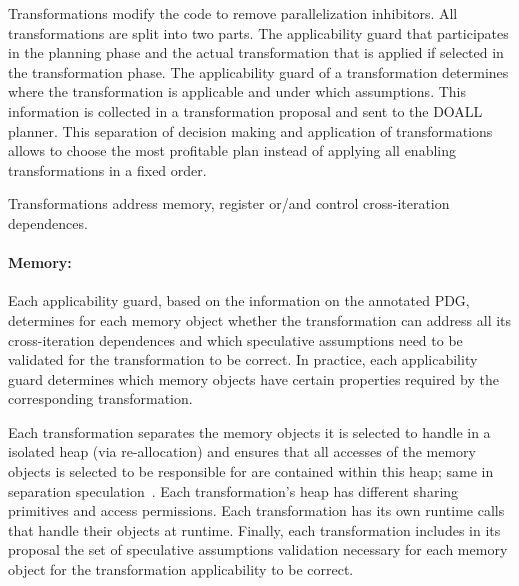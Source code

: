 Transformations modify the code to remove parallelization inhibitors.
%
All transformations are split into two parts. The applicability guard
that participates in the planning phase and the actual transformation
that is applied if selected in the transformation phase.
%
The applicability guard of a transformation determines where the
transformation is applicable and under which assumptions.
%
This information is collected in a transformation proposal and sent to
the DOALL planner.
%
This separation of decision making and application of transformations
allows \name to choose the most profitable plan instead of applying
all enabling transformations in a fixed order.
%

Transformations address memory, register or/and control
cross-iteration dependences.

\paragraph{Memory:} Each applicability guard, based on the information
on the annotated PDG, determines for each memory object whether the
transformation can address all its cross-iteration dependences and
which speculative assumptions need to be validated for the
transformation to be correct.
%
In practice, each applicability guard determines which memory objects
have certain properties required by the corresponding transformation.
%

Each transformation separates the memory objects it is selected to
handle in a isolated heap (via re-allocation) and ensures that all
accesses of the memory objects is selected to be responsible for are
contained within this heap; same in separation
speculation~\cite{johnson:17:cgo}.
%
Each transformation's heap has different sharing
primitives and access permissions. Each transformation has its own
runtime calls that handle their objects at runtime. Finally, each
transformation includes in its proposal the set of speculative
assumptions validation necessary for each memory object for the
transformation applicability to be correct.



